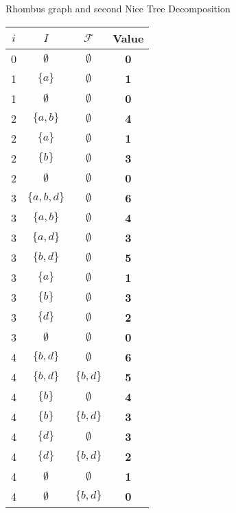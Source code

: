 \documentclass{beamer}
\begin{document}
\begin{frame}{Rhombus graph and second Nice Tree Decomposition}
  
  \begin{minipage}{0.33\textwidth}
    \renewcommand{\arraystretch}{0.3}
    \setlength{\tabcolsep}{0.7pt} 
    \begin{tabular}{|c| >{\footnotesize}c | >{\footnotesize}c | >{\footnotesize}c |}
    \hline
    \textbf{\(i\)} & \textbf{\(I\)} & \textbf{\(\mathcal{F}\)} & \textbf{Value} \\
    \hline
      0 & $\emptyset$ & $\emptyset$ & \textbf{0} \\
      \hline
      1 & $\{a\}$ & $\emptyset$ & \textbf{1} \\
      1 & $\emptyset$ & $\emptyset$ & \textbf{0} \\
      \hline
      2 & $\{a,b\}$ & $\emptyset$ & \textbf{4} \\
      2 & $\{a\}$ & $\emptyset$ & \textbf{1} \\
      2 & $\{b\}$ & $\emptyset$ & \textbf{3} \\
      2 & $\emptyset$ & $\emptyset$ & \textbf{0} \\
      \hline
      3 & $\{a,b,d\}$ & $\emptyset$ & \textbf{6} \\
      3 & $\{a,b\}$ & $\emptyset$ & \textbf{4} \\
      3 & $\{a,d\}$ & $\emptyset$ & \textbf{3} \\
      3 & $\{b,d\}$ & $\emptyset$ & \textbf{5} \\
      3 & $\{a\}$ & $\emptyset$ & \textbf{1} \\
      3 & $\{b\}$ & $\emptyset$ & \textbf{3} \\
      3 & $\{d\}$ & $\emptyset$ & \textbf{2} \\
      3 & $\emptyset$ & $\emptyset$ & \textbf{0} \\
      \hline
      4 & $\{b,d\}$ & $\emptyset$ & \textbf{6} \\
      4 & $\{b,d\}$ & $\{b,d\}$ & \textbf{5} \\
      4 & $\{b\}$ & $\emptyset$ & \textbf{4} \\
      4 & $\{b\}$ & $\{b,d\}$ & \textbf{3} \\
      4 & $\{d\}$ & $\emptyset$ & \textbf{3} \\
      4 & $\{d\}$ & $\{b,d\}$ & \textbf{2} \\
      4 & $\emptyset$ & $\emptyset$ & \textbf{1} \\
      4 & $\emptyset$ & $\{b,d\}$ & \textbf{0} \\


\end{tabular}
\end{minipage}
\end{frame}
\end{document}
